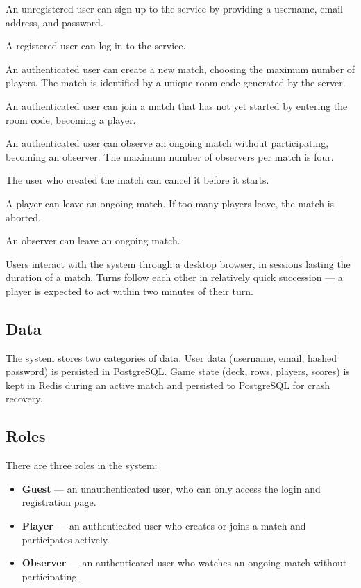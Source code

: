 \documentclass{scrartcl}
\begin{document}
An unregistered user can sign up to the service by providing a username,
email address, and password.

A registered user can log in to the service.

An authenticated user can create a new match, choosing the maximum number of players.
The match is identified by a unique room code generated by the server.

An authenticated user can join a match that has not yet started by entering the room code,
becoming a player.

An authenticated user can observe an ongoing match without participating,
becoming an observer. The maximum number of observers per match is four.

The user who created the match can cancel it before it starts.

A player can leave an ongoing match.
If too many players leave, the match is aborted.

An observer can leave an ongoing match.

Users interact with the system through a desktop browser, in sessions lasting
the duration of a match. Turns follow each other in relatively quick succession
--- a player is expected to act within two minutes of their turn.

\subsection*{Data}

The system stores two categories of data.
User data (username, email, hashed password) is persisted in PostgreSQL.
Game state (deck, rows, players, scores) is kept in Redis during an active match
and persisted to PostgreSQL for crash recovery.

\subsection*{Roles}

There are three roles in the system:
\begin{itemize}
  \item \textbf{Guest} --- an unauthenticated user, who can only access the login and registration page.
  \item \textbf{Player} --- an authenticated user who creates or joins a match and participates actively.
  \item \textbf{Observer} --- an authenticated user who watches an ongoing match without participating.
\end{itemize}
\end{document}
